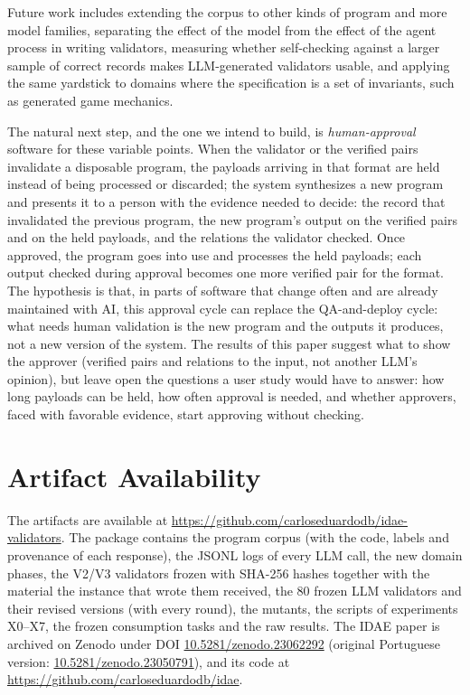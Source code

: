 \documentclass[sigconf,nonacm]{acmart}
\begin{document}
Future work includes extending the corpus to other kinds of program and more model families, separating the effect of the model from the effect of the agent process in writing validators, measuring whether self-checking against a larger sample of correct records makes LLM-generated validators usable, and applying the same yardstick to domains where the specification is a set of invariants, such as generated game mechanics.

The natural next step, and the one we intend to build, is \textit{human-approval} software for these variable points. When the validator or the verified pairs invalidate a disposable program, the payloads arriving in that format are held instead of being processed or discarded; the system synthesizes a new program and presents it to a person with the evidence needed to decide: the record that invalidated the previous program, the new program's output on the verified pairs and on the held payloads, and the relations the validator checked. Once approved, the program goes into use and processes the held payloads; each output checked during approval becomes one more verified pair for the format. The hypothesis is that, in parts of software that change often and are already maintained with AI, this approval cycle can replace the QA-and-deploy cycle: what needs human validation is the new program and the outputs it produces, not a new version of the system. The results of this paper suggest what to show the approver (verified pairs and relations to the input, not another LLM's opinion), but leave open the questions a user study would have to answer: how long payloads can be held, how often approval is needed, and whether approvers, faced with favorable evidence, start approving without checking.

\section*{Artifact Availability}

The artifacts are available at \url{https://github.com/carloseduardodb/idae-validators}. The package contains the program corpus (with the code, labels and provenance of each response), the JSONL logs of every LLM call, the new domain phases, the V2/V3 validators frozen with SHA-256 hashes together with the material the instance that wrote them received, the 80 frozen LLM validators and their revised versions (with every round), the mutants, the scripts of experiments X0--X7, the frozen consumption tasks and the raw results. The IDAE paper is archived on Zenodo under DOI \href{https://doi.org/10.5281/zenodo.23062292}{10.5281/zenodo.23062292} (original Portuguese version: \href{https://doi.org/10.5281/zenodo.23050791}{10.5281/zenodo.23050791}), and its code at \url{https://github.com/carloseduardodb/idae}.
\end{document}
